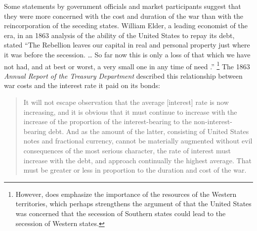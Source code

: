 Some statements by government officials and market participants suggest that they were more concerned with the cost and duration of the war than with the reincorporation of the seceding states.
William Elder, a leading economist of the era, in an 1863 analysis of the ability of the United States to repay its debt, stated ``The Rebellion leaves our capital in real and personal property just where it was before the secession. \dots{} So far now this is only a loss of that which we have not had, and at best or worst, a very small one in any time of need \parencite[19]{Elder1863}.''%
\footnote{
  However, \textcite{Elder1863} does emphasize the importance of the resources of the Western territories, which perhaps strengthens the argument of  \textcite{Weingast1998} that the United States was concerned that the secession of Southern states could lead to the secession of Western states.
}
The 1863 \textit{Annual Report of the Treasury Department} described this relationship between war costs and the interest rate it paid on its bonds:
\begin{quote}
It will not escape observation that the average [interest] rate is now increasing, and it is obvious that it must continue to increase with the increase of the proportion of the interest-bearing to the non-interest-bearing debt.
And as the amount of the latter, consisting of United States notes and fractional currency, cannot be materially augmented without evil consequences of the most serious character, the rate of interest must increase with the debt, and approach continually the highest average.
That must be greater or less in proportion to the duration and cost of the war. \parencite[13]{Treasury1863}
\end{quote}


